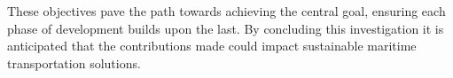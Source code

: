 These objectives pave the path towards achieving the central goal, ensuring each phase of development builds upon the last. By concluding this investigation it is anticipated that the contributions made could impact sustainable maritime transportation solutions.



